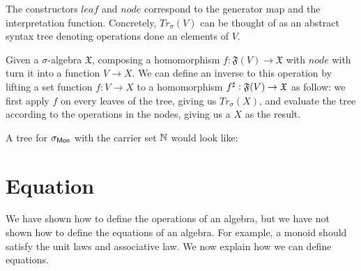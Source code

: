 The constructors $leaf$ and $node$ correspond to the generator map
and the interpretation function. Concretely, $Tr_\sigma(V)$ can
be thought of as an abstract syntax tree denoting operations done
an elements of $V$. 

Given a $\sigma$-algebra $\mathfrak{X}$, composing a homomorphism
$f : \mathfrak{F}(V) \to \mathfrak{X}$ with $node$ with turn it
into a function $V \to X$.
We can define an inverse to this operation by lifting a set function
$f : V \to X$ to a homomorphism ${f}^{\sharp} : \mathfrak{F}(V) \to \mathfrak{X}$
as follow: we first apply $f$ on every leaves of the tree, giving us
$Tr_\sigma(X)$, and evaluate the tree according to the operations
in the nodes, giving us a $X$ as the result.

\begin{example}
A tree for $\sigma_{\mathsf{Mon}}$ with the carrier set $\mathbb{N}$ would look like:
\begin{center}
\hspace{2em}
\end{center}
\end{example}

\section{Equation}
We have shown how to define the operations of an algebra, but we have not
shown how to define the equations of an algebra. For example, a monoid
should satisfy the unit laws and associative law. We now explain how
we can define equations.

